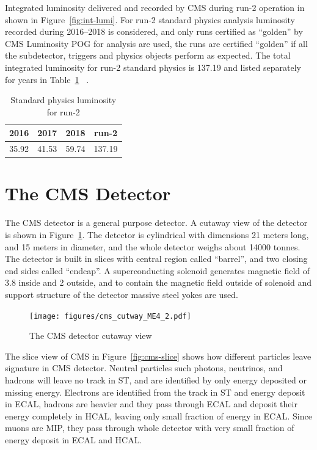 Integrated luminosity delivered and recorded by \gls{CMS} during run-2 operation
in shown in Figure~\ref{fig:int-lumi}.
For run-2 standard physics analysis luminosity recorded during
2016--2018 is considered, and only runs certified as ``golden'' by \gls{CMS}
Luminosity \gls{POG} for analysis are used, the runs
are certified ``golden'' if all the subdetector, triggers and
physics objects perform as expected. The total
integrated luminosity for run-2
standard physics is 137.19\fbinv{}
and listed separately for years in Table~\ref{tab:years-lumi}
~\cite{CMS-PAS-LUM-17-001,CMS-PAS-LUM-17-004,CMS-PAS-LUM-18-002}.

\begin{table}[!ht]
  \centering
  \caption[Standard physics integrated luminosity for run-2]%
  {Standard physics luminosity for run-2}
  \begin{tabular}{cccc}
    \toprule
    2016          & 2017          & 2018          & run-2          \\ \midrule
    35.92\fbinv{} & 41.53\fbinv{} & 59.74\fbinv{} & 137.19\fbinv{} \\
    \bottomrule
  \end{tabular}%
  \label{tab:years-lumi}
\end{table}

\section{
  The CMS Detector
 }\label{ch_cms:cms}

The \gls{CMS} detector is a general purpose detector.
A cutaway view of the detector is shown in Figure~\ref{fig:cms-cutaway}.
The detector is cylindrical with dimensions 21 meters long, and 15 meters
in diameter, and the whole detector weighs about 14000 tonnes.
The detector is built in slices with central region called ``barrel'',
and two closing end sides called ``endcap''.
A superconducting solenoid generates magnetic field of 3.8\Tesla{} inside
and 2\Tesla{} outside, and to contain the magnetic field outside of solenoid
and support structure of the detector massive steel yokes are used.

\begin{figure}[!ht]
  \centering
  \texttt{[image: figures/cms\_cutway\_ME4\_2.pdf]}
  \caption[The CMS detector cutaway view]%
  {The CMS detector cutaway view~\cite{image-cms-cutway}}%
  \label{fig:cms-cutaway}
\end{figure}

The slice view of \gls{CMS} in Figure~\ref{fig:cms-slice}
shows how different particles leave signature in \gls{CMS} detector.
Neutral particles such photons, neutrinos, and hadrons will leave no track
in \gls{ST}, and are identified by only energy deposited or missing energy.
Electrons are identified from the track in \gls{ST} and energy deposit
in \gls{ECAL}, hadrons are heavier and they pass through \gls{ECAL}
and deposit their energy completely in \gls{HCAL}, leaving only small fraction
of energy in \gls{ECAL}.
Since muons are \gls{MIP}, they pass through whole detector with very small
fraction of energy deposit in \gls{ECAL} and \gls{HCAL}.

